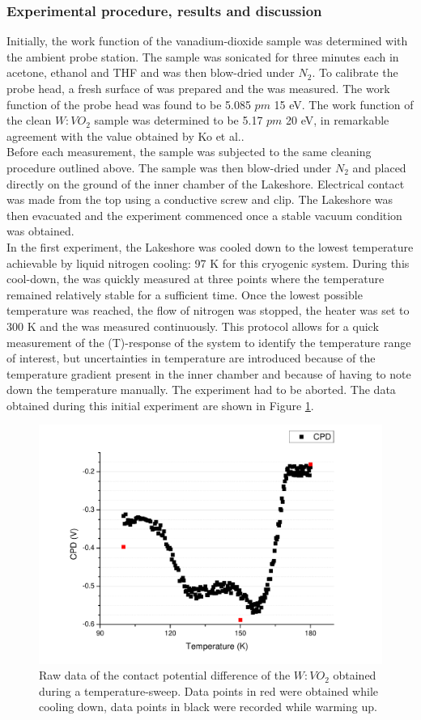 \subsubsection{Experimental procedure, results and discussion}
Initially, the work function of the vanadium-dioxide sample was determined with the ambient probe station. The sample was sonicated for three minutes each in acetone, ethanol and THF and was then blow-dried under $N_2$. To calibrate the probe head, a fresh surface of \hopg{} was prepared and the \cpd{} was measured. The work function of the probe head was found to be 5.085 $pm$ 15 eV. The work function of the clean $W:VO_2$ sample was determined to be 5.17 $pm$ 20 eV, in remarkable agreement with the value obtained by Ko et al.\cite{ko_kp}.\\
Before each measurement, the sample was subjected to the same cleaning procedure outlined above. The sample was then blow-dried under $N_2$ and placed directly on the ground of the inner chamber of the Lakeshore. Electrical contact was made from the top using a conductive screw and clip. The Lakeshore was then evacuated and the experiment commenced once a stable vacuum condition was obtained.\\
In the first experiment, the Lakeshore was cooled down to the lowest temperature achievable by liquid nitrogen cooling: 97 K for this cryogenic system. During this cool-down, the \cpd{} was quickly measured at three points where the temperature remained relatively stable for a sufficient time. Once the lowest possible temperature was reached, the flow of nitrogen was stopped, the heater was set to 300 K and the \cpd{} was measured continuously. This protocol allows for a quick measurement of the \cpd{}(T)-response of the system to identify the temperature range of interest, but uncertainties in temperature are introduced because of the temperature gradient present in the inner chamber and because of having to note down the temperature manually. The experiment had to be aborted. The data obtained during this initial experiment are shown in Figure \ref{fig:vox1}.\\
\begin{figure}
\centering
	\includegraphics[width=0.8\linewidth]{./figs/vox1}
	\caption{Raw data of the contact potential difference of the $W:VO_2$ obtained during a temperature-sweep. Data points in red were obtained while cooling down, data points in black were recorded while warming up.}
	\label{fig:vox1}
\end{figure}
